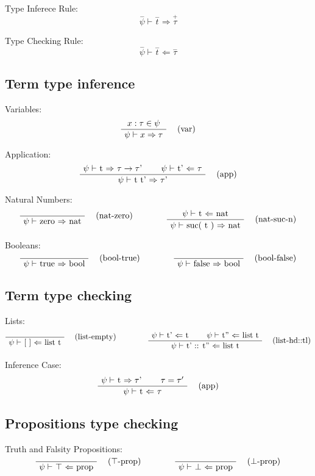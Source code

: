 \documentclass[twoside,a4paper]{article}
\begin{document}
Type Inferece Rule:
\[\overset{-}\psi \vdash \overset{-}{t} \Rightarrow \overset{+}\tau\]

Type Checking Rule:
\[\overset{-}\psi \vdash \overset{-}{t} \Leftarrow \overset{-}\tau\]

\subsection{Term type inference}
Variables:
\[
\AxiomC{$x : \tau \in \psi$}
\RightLabel{\quad (var)}
\UnaryInfC{$\psi \vdash x \Rightarrow \tau$}
\DisplayProof
\]

Application:
\[
\AxiomC{$\psi \vdash$ t $\Rightarrow$ $\tau \rightarrow \tau$'}
\AxiomC{$\psi \vdash$ t' $\Leftarrow$ $\tau$}
\RightLabel{\quad (app)}
\BinaryInfC{$\psi \vdash$ t t' $\Rightarrow$ $\tau$'}
\DisplayProof
\]

Natural Numbers:
\[
\AxiomC{}
\RightLabel{\quad (nat-zero)}
\UnaryInfC{$\psi \vdash$ zero $\Rightarrow$ nat}
\DisplayProof
\qquad
\qquad
\AxiomC{$\psi \vdash$ t $\Leftarrow$ nat}
\RightLabel{\quad (nat-suc-n)}
\UnaryInfC{$\psi \vdash$ suc( t ) $\Rightarrow$ nat}
\DisplayProof
\]

Booleans:
\[
\AxiomC{}
\RightLabel{\quad (bool-true)}
\UnaryInfC{$\psi \vdash$ true $\Rightarrow$ bool}
\DisplayProof
\qquad
\qquad
\AxiomC{}
\RightLabel{\quad (bool-false)}
\UnaryInfC{$\psi \vdash$ false $\Rightarrow$ bool}
\DisplayProof
\]

\subsection{Term type checking}
Lists:
\[
\AxiomC{}
\RightLabel{\quad (list-empty)}
\UnaryInfC{$\psi \vdash$ [ ] $\Leftarrow$ list t}
\DisplayProof
\qquad
\qquad
\AxiomC{$\psi \vdash$ t' $\Leftarrow$ t}
\AxiomC{$\psi \vdash$ t'' $\Leftarrow$ list t}
\RightLabel{\quad (list-hd::tl)}
\BinaryInfC{$\psi \vdash$ t' :: t'' $\Leftarrow$ list t}
\DisplayProof
\]

Inference Case:
\[
\AxiomC{$\psi \vdash$ t $\Rightarrow \tau$'}
\AxiomC{$\tau = \tau'$}
\RightLabel{\quad (app)}
\BinaryInfC{$\psi \vdash$ t $\Leftarrow$ $\tau$}
\DisplayProof
\]

\subsection{Propositions type checking}
Truth and Falsity Propositions:
\[
\AxiomC{}
\RightLabel{\quad ($\top$-prop)}
\UnaryInfC{$\psi \vdash$ $\top$ $\Leftarrow$  prop}
\DisplayProof
\qquad
\qquad
\AxiomC{}
\RightLabel{\quad ($\bot$-prop)}
\UnaryInfC{$\psi \vdash$ $\bot$ $\Leftarrow$ prop}
\DisplayProof
\]
\end{document}
